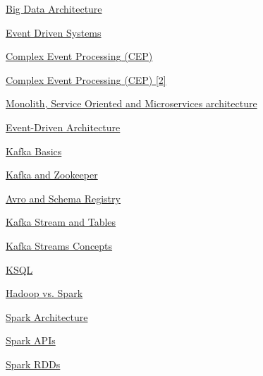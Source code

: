 \documentclass[10pt,a4paper]{article}
\begin{document}
\begin{thebibliography}{1}
\newblock \href{https://www.omnisci.com/technical-glossary/big-data-architecture}{Big Data Architecture}

\newblock \href{https://medium.com/omarelgabrys-blog/event-driven-systems-cdbe5a4b3d04}{Event Driven Systems}

\newblock \href{https://databricks.com/glossary/complex-event-processing}{Complex Event Processing (CEP)}

\newblock \href{https://datainsights.de/complex-event-processing}{Complex Event Processing (CEP) [2]}

\newblock \href{https://rubygarage.org/blog/monolith-soa-microservices-serverless}{Monolith, Service Oriented and Microservices architecture}

\newblock \href{https://aws.amazon.com/it/event-driven-architecture/}{Event-Driven Architecture}

\newblock \href{https://kafka.apache.org/intro}{Kafka Basics}

\newblock \href{https://www.cloudkarafka.com/blog/2018-07-04-cloudkarafka_what_is_zookeeper.html}{Kafka and Zookeeper}

\newblock \href{https://aseigneurin.github.io/2018/08/02/kafka-tutorial-4-avro-and-schema-registry.html}{Avro and Schema Registry}

\newblock \href{https://www.confluent.io/blog/kafka-streams-tables-part-1-event-streaming/}{Kafka Stream and Tables}

\newblock \href{https://docs.confluent.io/current/streams/concepts.html}{Kafka Streams Concepts}

\newblock \href{https://www.confluent.io/blog/ksql-streaming-sql-for-apache-kafka/}{KSQL}

\newblock \href{https://phoenixnap.com/kb/hadoop-vs-spark}{Hadoop vs. Spark}

\newblock \href{https://www.edureka.co/blog/spark-architecture/}{Spark Architecture}

\newblock \href{https://databricks.com/blog/2016/07/14/a-tale-of-three-apache-spark-apis-rdds-dataframes-and-datasets.html}{Spark APIs}

\newblock \href{https://intellipaat.com/blog/tutorial/spark-tutorial/programming-with-rdds/}{Spark RDDs}


\end{thebibliography}
\end{document}
